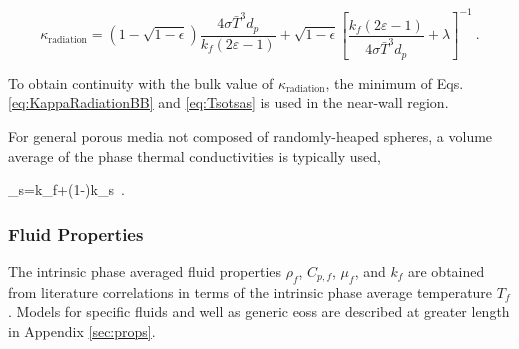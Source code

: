 \begin{equation}
\label{eq:Tsotsas}
\kappa_\text{radiation}=\left(1-\sqrt{1-\epsilon}\right)\frac{4\sigma\bar{T}^3d_p}{k_f\left(2\varepsilon-1\right)}+\sqrt{1-\epsilon}\left\lbrack\frac{k_f\left(2\varepsilon-1\right)}{4\sigma\bar{T}^3d_p}+\lambda\right\rbrack^{-1}\ .
\end{equation}

\noindent To obtain continuity with the bulk value of \(\kappa_\text{radiation}\), the minimum of Eqs. \eqref{eq:KappaRadiationBB} and \eqref{eq:Tsotsas} is used in the near-wall region.

For general porous media not composed of randomly-heaped spheres, a volume average of the phase thermal conductivities is typically used,

\beq
\label{eq:VolumeAverageKappaSolid}
\kappa_s=\epsilon k_f+(1-\epsilon)k_s\ .
\eeq

\subsubsection{Fluid Properties}
\label{sec:FPs}

The intrinsic phase averaged fluid properties \(\rho_f\), \(C_{p,f}\), \(\mu_f\), and \(k_f\) are obtained from literature correlations in terms of the intrinsic phase average temperature \(T_f\). Models for specific fluids and well as generic \glspl{eos} are described at greater length in Appendix \ref{sec:props}.







